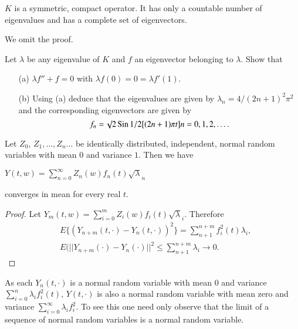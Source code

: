 \begin{theorem*}
$K$ is a symmetric, compact operator. It has only a countable number
  of eigenvalues and has a complete set of eigenvectors.
\end{theorem*}

We omit the proof.

\begin{exercise}\label{chap14-exer2}
Let $\lambda$ be any eigenvalue of $K$ and $f$ an eigenvector
belonging to $\lambda$. Show that
\begin{itemize}
\item[(a)] $\lambda f''+f=0$ with $\lambda f(0)=0=\lambda f'(1)$.

\item[(b)] Using (a) deduce that the eigenvalues are given by
  $\lambda_{n}=4/(2n+1)^{2}\pi^{2}$ and the corresponding eigenvectors
  are given by 
$$
f_{n}=\surd 2 \operatorname{Sin} 1/2[(2n+1)\pi t]n=0,1,2,\ldots.
$$
\end{itemize}

Let $Z_{0}$, $Z_{1},\ldots,Z_{n}\ldots$ be identically distributed,
independent, normal random variables with mean $0$ and variance
$1$. Then we have
\end{exercise}

\begin{prop*}
$Y(t,w)=\sum\limits^{\infty}_{n=0}Z_{n}(w)f_{n}(t)\surd \lambda_{n}$

\noindent
converges in mean for every real $t$.
\end{prop*}

\begin{proof}
Let\pageoriginale
$Y_{m}(t,w)=\sum\limits^{m}_{i=0}Z_{i}(w)f_{i}(t)\surd\lambda_{i}$. Therefore
\begin{align*}
&
  E\{(Y_{n+m}(t,\cdot)-Y_{n}(t,\cdot))^{2}\}=\sum\limits^{n+m}_{n+1}f^{2}_{i}(t)\lambda_{i},\\
& E(||Y_{n+m}(\cdot)-Y_{n}(\cdot)||^{2}\leq
  \sum\limits^{n+m}_{n+1}\lambda_{i}\to 0.
\end{align*}
\end{proof}

\begin{remark*}
As each $Y_{n}(t,\cdot)$ is a normal random variable with mean $0$ and
variance $\sum\limits^{n}_{i=0}\lambda_{i}f^{2}_{i}(t)$, $Y(t,\cdot)$
is also a normal random variable with mean zero and variance
$\sum\limits^{\infty}_{i=0}\lambda_{i}f^{2}_{i}$. To see this one need
only observe that the limit of a sequence of normal random variables
is a normal random variable.
\end{remark*}

